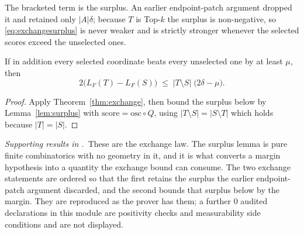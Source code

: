 
The bracketed term is the surplus. An earlier endpoint-patch argument dropped it and retained
only $|A|\delta$; because $T$ is Top-$k$ the surplus is non-negative, so
\eqref{eq:exchangesurplus} is never weaker and is strictly stronger whenever the selected
scores exceed the unselected ones.

\begin{theorem}
\label{thm:marginexchange}
If in addition every selected coordinate beats every unselected one by at least $\mu$, then
\begin{equation}
2\bigl(L_{F}(T)-L_{F}(S)\bigr)\;\leq\;|T\setminus S|\;\bigl(2\delta-\mu\bigr).
\label{eq:marginexchange}
\end{equation}
\end{theorem}

\begin{proof}
Apply Theorem~\ref{thm:exchange}, then bound the surplus below by Lemma~\ref{lem:surplus}
with $\mathrm{score}=\mathrm{osc}\circ Q$, using $|T\setminus S|=|S\setminus T|$ which holds
because $|T|=|S|$.
\end{proof}


\noindent\emph{Supporting results in .}~These are the exchange law. The surplus lemma is pure finite combinatorics with no geometry in it, and it is what converts a margin hypothesis into a quantity the exchange bound can consume. The two exchange statements are ordered so that the first retains the surplus the earlier endpoint-patch argument discarded, and the second bounds that surplus below by the margin. They are reproduced as the prover has them; a further $0$ audited declarations in this module are positivity checks and measurability side conditions and are not displayed.

